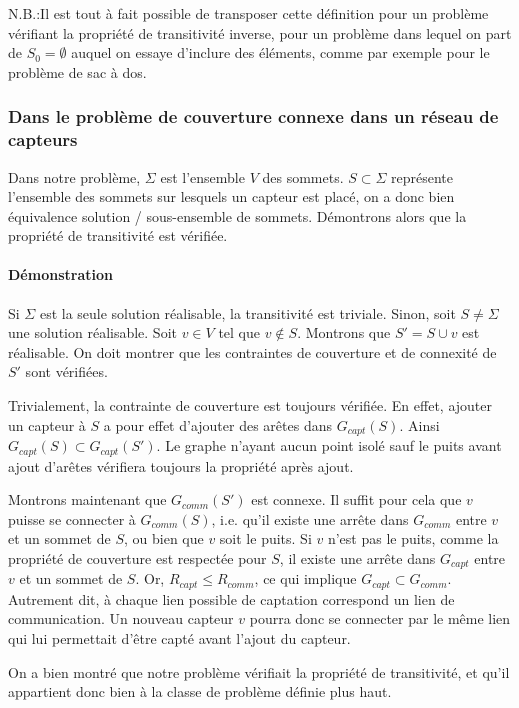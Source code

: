 \documentclass[12pt,a4paper]{article}
\begin{document}
N.B.:Il est tout à fait possible de transposer cette définition pour un problème vérifiant la propriété de transitivité inverse, pour un problème dans lequel on part de $S_0=\emptyset$ auquel on essaye d'inclure des éléments, comme par exemple pour le problème de sac à dos.

\subsubsection{Dans le problème de couverture connexe dans un réseau de capteurs}
Dans notre problème, $\Sigma$ est l'ensemble $V$ des sommets. $S\subset \Sigma$ représente l'ensemble des sommets sur lesquels un capteur est placé, on a donc bien équivalence solution / sous-ensemble de sommets. Démontrons alors que la propriété de transitivité est vérifiée.
\paragraph{Démonstration}
Si $\Sigma$ est la seule solution réalisable, la transitivité est triviale. Sinon, soit $S\neq \Sigma$ une solution réalisable. Soit $v \in V$ tel que $v\notin   S$. Montrons que $S'=S\cup v$ est réalisable. On doit montrer que les contraintes de couverture et de connexité de $S'$ sont vérifiées.

Trivialement, la contrainte de couverture est toujours vérifiée. En effet, ajouter un capteur à $S$ a pour effet d'ajouter des arêtes dans $G_{capt}(S)$. Ainsi $G_{capt}(S)\subset G_{capt}(S')$. Le graphe n'ayant aucun point isolé sauf le puits avant ajout d'arêtes vérifiera toujours la propriété après ajout. 

Montrons maintenant que $G_{comm}(S')$ est connexe. Il suffit pour cela que $v$ puisse se connecter à $G_{comm}(S)$, i.e. qu'il existe une arrête dans $G_{comm}$ entre $v$ et un sommet de $S$, ou bien que $v$ soit le puits. Si $v$ n'est pas le puits, comme la propriété de couverture est respectée pour $S$, il existe une arrête dans $G_{capt}$ entre $v$ et un sommet de $S$. Or, $R_{capt}\leq R_{comm}$, ce qui implique $G_{capt}\subset G_{comm}$. Autrement dit, à chaque lien possible de captation correspond un lien de communication. Un nouveau capteur $v$ pourra donc se connecter par le même lien qui lui permettait d'être capté avant l'ajout du capteur.

On a bien montré que notre problème vérifiait la propriété de transitivité, et qu'il appartient donc bien à la classe de problème définie plus haut.
\end{document}
